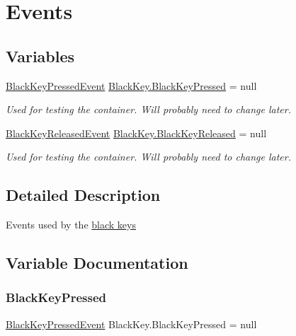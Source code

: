 \hypertarget{group___black_key_events}{}\section{Events}
\label{group___black_key_events}
\subsection*{Variables}
\begin{DoxyCompactItemize}
\item 
\hyperlink{group___black_key_event_types_class_black_key_1_1_black_key_pressed_event}{Black\+Key\+Pressed\+Event} \hyperlink{group___black_key_events_ga51f1badf49df0c54e31a20ba4b7abd6b}{Black\+Key.\+Black\+Key\+Pressed} = null
\begin{DoxyCompactList}\small\item\em Used for testing the container. Will probably need to change later. \end{DoxyCompactList}\item 
\hyperlink{group___black_key_event_types_class_black_key_1_1_black_key_released_event}{Black\+Key\+Released\+Event} \hyperlink{group___black_key_events_ga2710bdaba16dbdb82c0d38f11ce642d8}{Black\+Key.\+Black\+Key\+Released} = null
\begin{DoxyCompactList}\small\item\em Used for testing the container. Will probably need to change later. \end{DoxyCompactList}\end{DoxyCompactItemize}


\subsection{Detailed Description}
Events used by the \hyperlink{group___doc_black_key}{black keys} 

\subsection{Variable Documentation}
\mbox{\label{group___black_key_events_ga51f1badf49df0c54e31a20ba4b7abd6b}} 
\subsubsection{\texorpdfstring{Black\+Key\+Pressed}{BlackKeyPressed}}
{\footnotesize\ttfamily \hyperlink{group___black_key_event_types_class_black_key_1_1_black_key_pressed_event}{Black\+Key\+Pressed\+Event} Black\+Key.\+Black\+Key\+Pressed = null}



